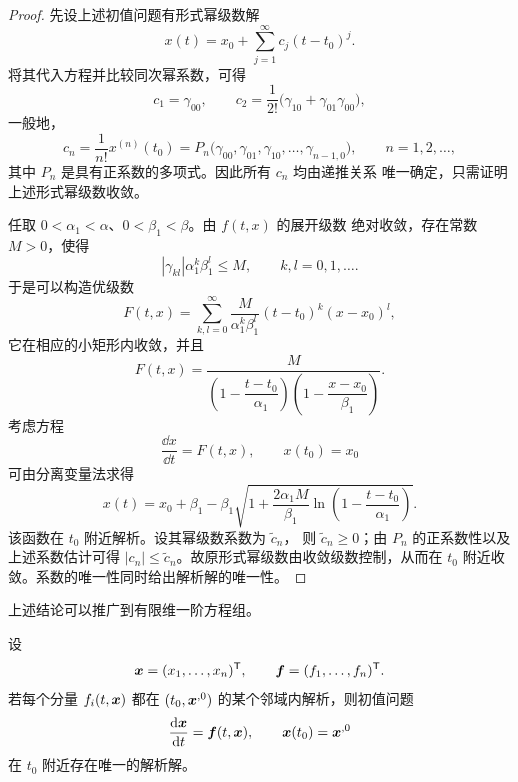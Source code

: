\begin{proof}
	先设上述初值问题有形式幂级数解
	\[
		x(t)=x_0+\sum_{j=1}^{\infty}c_j(t-t_0)^j.
	\]
	将其代入方程并比较同次幂系数，可得
	\[
		c_1=\gamma_{00},
		\qquad
		c_2=\dfrac{1}{2!}
		\bigl(\gamma_{10}+\gamma_{01}\gamma_{00}\bigr),
	\]
	一般地，
	\[
		c_n=\dfrac{1}{n!}x^{(n)}(t_0)
		=P_n\bigl(\gamma_{00},\gamma_{01},\gamma_{10},
		\ldots,\gamma_{n-1,0}\bigr),
		\qquad n=1,2,\ldots,
	\]
	其中 $P_n$ 是具有正系数的多项式。因此所有 $c_n$ 均由递推关系
	唯一确定，只需证明上述形式幂级数收敛。

	任取 $0<\alpha_1<\alpha$、$0<\beta_1<\beta$。由 $f(t,x)$ 的展开级数
	绝对收敛，存在常数 $M>0$，使得
	\[
		|\gamma_{kl}|\alpha_1^k\beta_1^l\leq M,
		\qquad k,l=0,1,\ldots.
	\]
	于是可以构造优级数
	\[
		F(t,x)=\sum_{k,l=0}^{\infty}
		\dfrac{M}{\alpha_1^k\beta_1^l}
		(t-t_0)^k(x-x_0)^l,
	\]
	它在相应的小矩形内收敛，并且
	\[
		F(t,x)=
		\dfrac{M}
		{\left(1-\dfrac{t-t_0}{\alpha_1}\right)
		 \left(1-\dfrac{x-x_0}{\beta_1}\right)}.
	\]
	考虑方程
	\[
		\dfrac{\dd x}{\dd t}=F(t,x),
		\qquad x(t_0)=x_0
	\]
	可由分离变量法求得
	\[
		x(t)=x_0+\beta_1-\beta_1
		\sqrt{1+\dfrac{2\alpha_1M}{\beta_1}
		\ln\left(1-\dfrac{t-t_0}{\alpha_1}\right)}.
	\]
	该函数在 $t_0$ 附近解析。设其幂级数系数为 $\widetilde c_n$，
	则 $\widetilde c_n\geq 0$；由 $P_n$ 的正系数性以及上述系数估计可得
	$|c_n|\leq\widetilde c_n$。故原形式幂级数由收敛级数控制，从而在
	$t_0$ 附近收敛。系数的唯一性同时给出解析解的唯一性。
\end{proof}

上述结论可以推广到有限维一阶方程组。

\begin{corollary}\label{prop:Cauchy定理的有限维推广}
	设
	\[
		\boldsymbol{x}=(x_1,\ldots,x_n)^{\mathsf T},
		\qquad
		\boldsymbol{f}=(f_1,\ldots,f_n)^{\mathsf T}.
	\]
	若每个分量 $f_i(t,\boldsymbol{x})$ 都在
	$(t_0,\boldsymbol{x}^{,0})$ 的某个邻域内解析，则初值问题
	\[
		\dfrac{\mathrm{d}\boldsymbol{x}}{\mathrm{d} t}=\boldsymbol{f}(t,\boldsymbol{x}),
		\qquad
		\boldsymbol{x}(t_0)=\boldsymbol{x}^{,0}
	\]
	在 $t_0$ 附近存在唯一的解析解。
\end{corollary}

